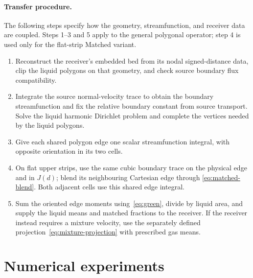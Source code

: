 \documentclass[10pt]{article}
\begin{document}
\paragraph{Transfer procedure.}
The following steps specify how the geometry, streamfunction, and receiver
data are coupled. Steps 1--3 and 5 apply to the general polygonal operator;
step 4 is used only for the flat-strip Matched variant.
\begin{enumerate}
\item Reconstruct the receiver's embedded bed from its nodal signed-distance
data, clip the liquid polygons on that geometry, and check source boundary
flux compatibility.
\item Integrate the source normal-velocity trace to obtain the boundary
streamfunction and fix the relative boundary constant from source transport.
Solve the liquid harmonic Dirichlet problem and complete the vertices needed
by the liquid polygons.
\item Give each shared polygon edge one scalar streamfunction integral,
with opposite orientation in its two cells.
\item On flat upper strips, use the same cubic boundary trace on the physical
edge and in $J(d)$; blend its neighbouring Cartesian edge through
\eqref{eq:matched-blend}. Both adjacent cells use this shared edge integral.
\item Sum the oriented edge moments using~\eqref{eq:green}, divide by
liquid area, and supply the liquid means and matched fractions to the receiver. If
the receiver instead requires a mixture velocity, use the separately
defined projection~\eqref{eq:mixture-projection} with prescribed gas means.
\end{enumerate}

\section{Numerical experiments}
\end{document}
